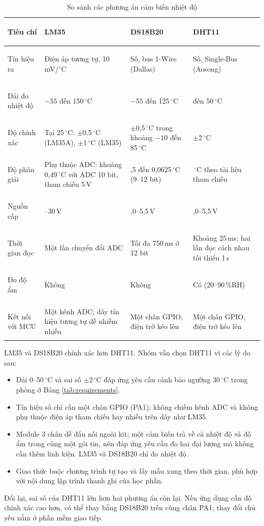 \begin{table}[H]
\centering
\small
\caption{So sánh các phương án cảm biến nhiệt độ}
\label{tab:sensor-compare}
\renewcommand{\arraystretch}{1.15}
\setlength{\tabcolsep}{4pt}
\begin{tabularx}{\textwidth}{>{\bfseries\raggedright\arraybackslash}p{2.6cm} >{\raggedright\arraybackslash}X >{\raggedright\arraybackslash}X >{\raggedright\arraybackslash}X}
\toprule
Tiêu chí & LM35 & DS18B20 & DHT11 \\
\midrule
Tín hiệu ra & Điện áp tương tự, 10\,mV/$^\circ$C & Số, bus 1-Wire (Dallas) & Số, Single-Bus (Aosong) \\
Dải đo nhiệt độ & $-55$ đến 150\,$^\circ$C & $-55$ đến 125\,$^\circ$C & 0 đến 50\,$^\circ$C \\
Độ chính xác & Tại 25\,$^\circ$C: $\pm$0,5\,$^\circ$C (LM35A), $\pm$1\,$^\circ$C (LM35) & $\pm$0,5\,$^\circ$C trong khoảng $-10$ đến 85\,$^\circ$C & $\pm$2\,$^\circ$C \\
Độ phân giải & Phụ thuộc ADC: khoảng 0,49\,$^\circ$C với ADC 10 bit, tham chiếu 5\,V & 0,5 đến 0,0625\,$^\circ$C (9--12 bit) & 1\,$^\circ$C theo tài liệu tham chiếu \\
Nguồn cấp & 4--30\,V & 3,0--5,5\,V & 3,0--5,5\,V \\
Thời gian đọc & Một lần chuyển đổi ADC & Tối đa 750\,ms ở 12 bit & Khoảng 25\,ms; hai lần đọc cách nhau tối thiểu 1\,s \\
Đo độ ẩm & Không & Không & Có (20--90\,\%RH) \\
Kết nối với MCU & Một kênh ADC; dây tín hiệu tương tự dễ nhiễm nhiễu & Một chân GPIO, điện trở kéo lên & Một chân GPIO, điện trở kéo lên \\
\bottomrule
\end{tabularx}
\end{table}

LM35 và DS18B20 chính xác hơn DHT11. Nhóm vẫn chọn DHT11 vì các lý do sau:
\begin{itemize}[leftmargin=1.2cm]
    \item Dải 0--50\,$^\circ$C và sai số $\pm$2\,$^\circ$C đáp ứng yêu cầu cảnh báo ngưỡng 30\,$^\circ$C trong phòng ở Bảng \ref{tab:requirements}.
    \item Tín hiệu số chỉ cần một chân GPIO (PA1); không chiếm kênh ADC và không phụ thuộc điện áp tham chiếu hay nhiễu trên dây như LM35.
    \item Module 3 chân dễ đấu nối ngoài kit; một cảm biến trả về cả nhiệt độ và độ ẩm trong cùng một gói tin, nên đáp ứng yêu cầu đo hai đại lượng mà không cần thêm linh kiện. LM35 và DS18B20 chỉ đo nhiệt độ.
    \item Giao thức buộc chương trình tự tạo và lấy mẫu xung theo thời gian, phù hợp với nội dung lập trình thanh ghi của học phần.
\end{itemize}
Đổi lại, sai số của DHT11 lớn hơn hai phương án còn lại. Nếu ứng dụng cần độ chính xác cao hơn, có thể thay bằng DS18B20 trên cùng chân PA1; thay đổi chủ yếu nằm ở phần mềm giao tiếp.

